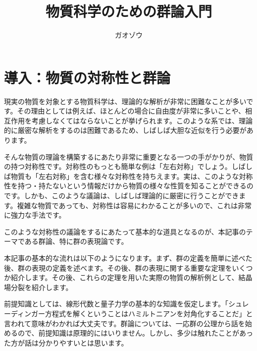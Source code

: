 \documentclass[uplatex,dvipdfmx,a4j]{jsarticle}
\title{物質科学のための群論入門}
\author{ガオゾウ}
\begin{document}
\maketitle
\section{導入：物質の対称性と群論}
現実の物質を対象とする物質科学は、理論的な解析が非常に困難なことが多いです。その理由としては例えば、ほとんどの場合に自由度が非常に多いことや、相互作用を考慮しなくてはならないことが挙げられます。このような系では、理論的に厳密な解析をするのは困難であるため、しばしば大胆な近似を行う必要があります。

そんな物質の理論を構築するにあたり非常に重要となる一つの手がかりが、物質の持つ対称性です。対称性のもっとも簡単な例は「左右対称」でしょう。しばしば物質も「左右対称」を含む様々な対称性を持ちえます。実は、このような対称性を持つ・持たないという情報だけから物質の様々な性質を知ることができるのです。しかも、このような議論は、しばしば理論的に厳密に行うことができます。複雑な物質であっても、対称性は容易にわかることが多いので、これは非常に強力な手法です。



このような対称性の議論をするにあたって基本的な道具となるのが、本記事のテーマである群論、特に群の表現論です。

本記事の基本的な流れは以下のようになります。まず、群の定義を簡単に述べた後、群の表現の定義を述べます。その後、群の表現に関する重要な定理をいくつか紹介します。その後、これらの定理を用いた実際の物質の解析例として、結晶場分裂を紹介します。

前提知識としては、線形代数と量子力学の基本的な知識を仮定します。「シュレーディンガー方程式を解くということはハミルトニアンを対角化することだ」と言われて意味がわかれば大丈夫です。群論については、一応群の公理から話を始めるので、前提知識は原理的にはいりません。しかし、多少は触れたことがあった方が話は分かりやすいとは思います。
\end{document}
